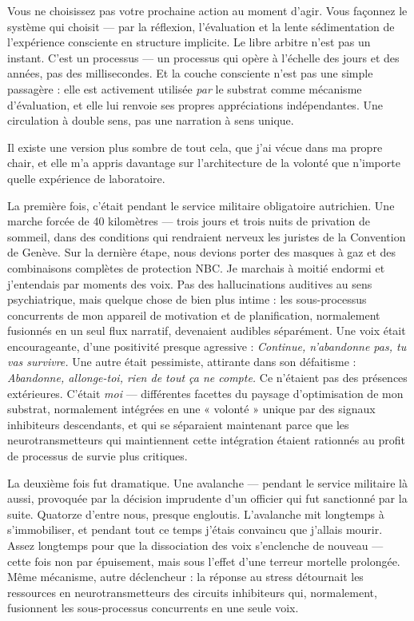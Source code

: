 \documentclass[11pt, twoside, openright]{book}
\begin{document}
Vous ne choisissez pas votre prochaine action au moment d'agir. Vous façonnez le système qui choisit --- par la réflexion, l'évaluation et la lente sédimentation de l'expérience consciente en structure implicite. Le libre arbitre n'est pas un instant. C'est un processus --- un processus qui opère à l'échelle des jours et des années, pas des millisecondes. Et la couche consciente n'est pas une simple passagère : elle est activement utilisée \textit{par} le substrat comme mécanisme d'évaluation, et elle lui renvoie ses propres appréciations indépendantes. Une circulation à double sens, pas une narration à sens unique.

Il existe une version plus sombre de tout cela, que j'ai vécue dans ma propre chair, et elle m'a appris davantage sur l'architecture de la volonté que n'importe quelle expérience de laboratoire.

La première fois, c'était pendant le service militaire obligatoire autrichien. Une marche forcée de 40 kilomètres --- trois jours et trois nuits de privation de sommeil, dans des conditions qui rendraient nerveux les juristes de la Convention de Genève. Sur la dernière étape, nous devions porter des masques à gaz et des combinaisons complètes de protection NBC. Je marchais à moitié endormi et j'entendais par moments des voix. Pas des hallucinations auditives au sens psychiatrique, mais quelque chose de bien plus intime : les sous-processus concurrents de mon appareil de motivation et de planification, normalement fusionnés en un seul flux narratif, devenaient audibles séparément. Une voix était encourageante, d'une positivité presque agressive : \textit{Continue, n'abandonne pas, tu vas survivre.} Une autre était pessimiste, attirante dans son défaitisme : \textit{Abandonne, allonge-toi, rien de tout ça ne compte.} Ce n'étaient pas des présences extérieures. C'était \textit{moi} --- différentes facettes du paysage d'optimisation de mon substrat, normalement intégrées en une « volonté » unique par des signaux inhibiteurs descendants, et qui se séparaient maintenant parce que les neurotransmetteurs qui maintiennent cette intégration étaient rationnés au profit de processus de survie plus critiques.

La deuxième fois fut dramatique. Une avalanche --- pendant le service militaire là aussi, provoquée par la décision imprudente d'un officier qui fut sanctionné par la suite. Quatorze d'entre nous, presque engloutis. L'avalanche mit longtemps à s'immobiliser, et pendant tout ce temps j'étais convaincu que j'allais mourir. Assez longtemps pour que la dissociation des voix s'enclenche de nouveau --- cette fois non par épuisement, mais sous l'effet d'une terreur mortelle prolongée. Même mécanisme, autre déclencheur : la réponse au stress détournait les ressources en neurotransmetteurs des circuits inhibiteurs qui, normalement, fusionnent les sous-processus concurrents en une seule voix.
\end{document}
